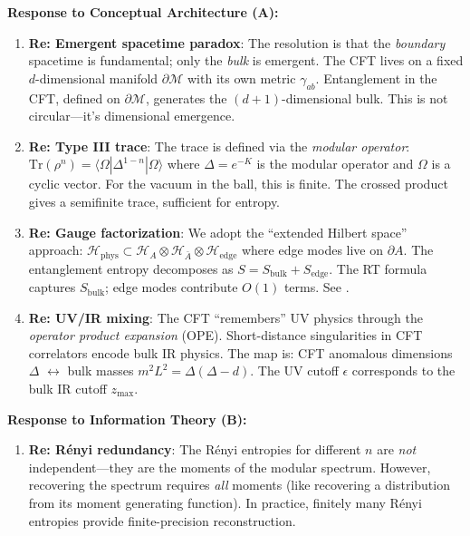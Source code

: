 \documentclass[12pt,a4paper]{article}
\begin{document}
\begin{tcolorbox}[colback=blue!5!white, colframe=blue!75!black, title=\textbf{BLUE TEAM Round 6: Foundational Responses}]

\textbf{Response to Conceptual Architecture (A):}

\begin{enumerate}[label=\textbf{B6.\arabic*.}]
    \item \textbf{Re: Emergent spacetime paradox}: The resolution is that the \emph{boundary} spacetime is fundamental; only the \emph{bulk} is emergent. The CFT lives on a fixed $d$-dimensional manifold $\partial\mathcal{M}$ with its own metric $\gamma_{ab}$. Entanglement in the CFT, defined on $\partial\mathcal{M}$, generates the $(d+1)$-dimensional bulk. This is not circular---it's dimensional emergence.
    
    \item \textbf{Re: Type III trace}: The trace is defined via the \emph{modular operator}: $\text{Tr}(\rho^n) = \langle\Omega|\Delta^{1-n}|\Omega\rangle$ where $\Delta = e^{-K}$ is the modular operator and $\Omega$ is a cyclic vector. For the vacuum in the ball, this is finite. The crossed product gives a semifinite trace, sufficient for entropy.
    
    \item \textbf{Re: Gauge factorization}: We adopt the ``extended Hilbert space'' approach: $\mathcal{H}_{\text{phys}} \subset \mathcal{H}_A \otimes \mathcal{H}_{\bar{A}} \otimes \mathcal{H}_{\text{edge}}$ where edge modes live on $\partial A$. The entanglement entropy decomposes as $S = S_{\text{bulk}} + S_{\text{edge}}$. The RT formula captures $S_{\text{bulk}}$; edge modes contribute $O(1)$ terms. See \cite{donnelly2016, speranza2016}.
    
    \item \textbf{Re: UV/IR mixing}: The CFT ``remembers'' UV physics through the \emph{operator product expansion} (OPE). Short-distance singularities in CFT correlators encode bulk IR physics. The map is: CFT anomalous dimensions $\Delta$ $\leftrightarrow$ bulk masses $m^2 L^2 = \Delta(\Delta - d)$. The UV cutoff $\epsilon$ corresponds to the bulk IR cutoff $z_{\text{max}}$.
\end{enumerate}

\textbf{Response to Information Theory (B):}

\begin{enumerate}[resume, label=\textbf{B6.\arabic*.}]
    \item \textbf{Re: R\'enyi redundancy}: The R\'enyi entropies for different $n$ are \emph{not} independent---they are the moments of the modular spectrum. However, recovering the spectrum requires \emph{all} moments (like recovering a distribution from its moment generating function). In practice, finitely many R\'enyi entropies provide finite-precision reconstruction.
    

\end{enumerate}
\end{tcolorbox}
\end{document}
